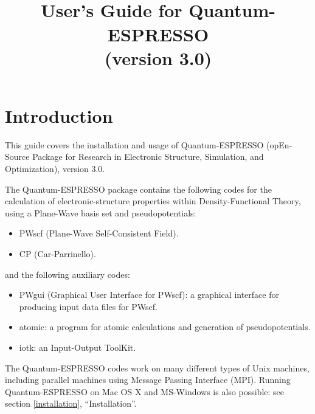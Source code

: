 \documentclass[12pt,a4paper]{article}
\def\version{3.0}
\begin{document}
 

\author{}
\date{}
\title{
  \hfill%
  \vspace{1.5cm}
  \\
  \huge User's Guide for Quantum-ESPRESSO \smallskip\\
  \Large (version \version)
}
\maketitle

\tableofcontents

\clearpage

\section{Introduction}

This guide covers the installation and usage of Quantum-ESPRESSO
(opEn-Source Package for Research in Electronic Structure, Simulation,
and Optimization), version \version.

The Quantum-ESPRESSO package contains the following codes for the
calculation of electronic-structure properties within
Density-Functional Theory, using a Plane-Wave basis set and
pseudopotentials:
\begin{itemize}
  \item PWscf (Plane-Wave Self-Consistent Field).
  \item CP (Car-Parrinello).
\end{itemize}
and the following auxiliary codes:
\begin{itemize}
  \item PWgui (Graphical User Interface for PWscf): a graphical
        interface for producing input data files for PWscf.
  \item atomic: a program for atomic calculations and generation of
        pseudopotentials.
  \item iotk: an Input-Output ToolKit.
\end{itemize}
%
The Quantum-ESPRESSO codes work on many different types of Unix machines,
including parallel machines using Message Passing Interface (MPI).
Running Quantum-ESPRESSO on Mac OS X and MS-Windows is also possible: 
see section \ref{installation}, ``Installation''.
\end{document}
